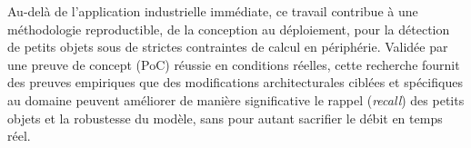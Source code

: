 Au-delà de l'application industrielle immédiate, ce travail contribue à une méthodologie reproductible, de la conception au déploiement, pour la détection de petits objets sous de strictes contraintes de calcul en périphérie. Validée par une preuve de concept (PoC) réussie en conditions réelles, cette recherche fournit des preuves empiriques que des modifications architecturales ciblées et spécifiques au domaine peuvent améliorer de manière significative le rappel (\textit{recall}) des petits objets et la robustesse du modèle, sans pour autant sacrifier le débit en temps réel.
